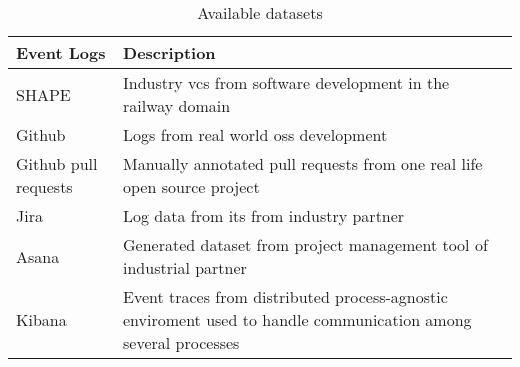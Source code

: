 \begin{table}[]
\centering
\caption{Available datasets}
\label{tab:dataset}
\begin{tabular}{@{}m{2.5cm}m{9cm}@{}}
\toprule
\textbf{Event Logs} & \textbf{Description} \\ \midrule
SHAPE & Industry \gls{vcs} from software development in the railway domain \\
Github & Logs from real world \gls{oss} development \\
Github pull requests & Manually annotated pull requests from one real life open source project \\
Jira & Log data from \gls{its} from industry partner \\
Asana & Generated dataset from project management tool of industrial partner \\
Kibana & Event traces from distributed process-agnostic enviroment used to handle communication among several processes \\ \bottomrule
\end{tabular}
\end{table}